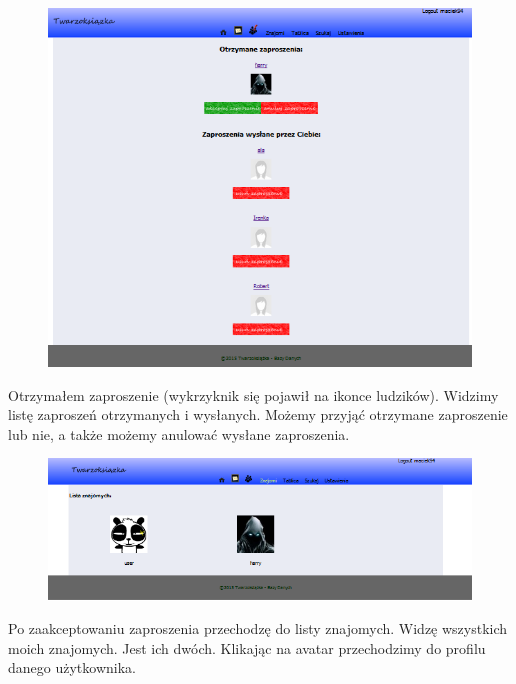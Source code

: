 \documentclass[a4paper,10pt,table]{article}
\begin{document}
\begin{figure}[h]
\begin{center}
\includegraphics[scale=0.5]{scrn/6}
\end{center}
\end{figure}
Otrzymałem zaproszenie (wykrzyknik się pojawił na ikonce ludzików). Widzimy listę zaproszeń otrzymanych i wysłanych. Możemy przyjąć otrzymane zaproszenie lub nie, a także możemy anulować wysłane zaproszenia.
\newpage
\begin{figure}[h]
\begin{center}
\includegraphics[scale=0.6]{scrn/7}
\end{center}
\end{figure}
Po zaakceptowaniu zaproszenia przechodzę do listy znajomych. Widzę wszystkich moich znajomych. Jest ich dwóch. Klikając na avatar przechodzimy do profilu danego użytkownika.
\end{document}
